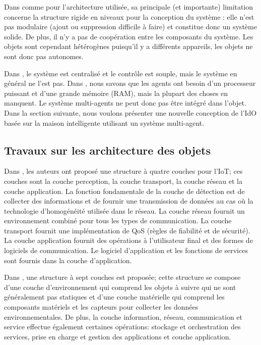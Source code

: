 Dans \cite{chap34} \cite{chap39} \cite{chap311}comme pour l'architecture utilisée, sa principale (et importante) limitation concerne la structure rigide en niveaux pour la conception du système : elle n'est pas modulaire (ajout ou suppression difficile à faire) et constitue donc un système solide. De plus, il n'y a pas de coopération entre les composants du système. Les objets sont cependant hétérogènes puisqu'il y a différents appareils, les objets ne sont donc pas autonomes. 


Dans \cite{chap39}, le système est centralisé et le contrôle est souple, mais le système en général ne l'est pas. Dans \cite{chap311}, nous savons que les agents ont besoin d'un processeur puissant et d'une grande mémoire (RAM), mais la plupart des choses en manquent. Le système multi-agents ne peut donc pas être intégré dans l'objet. Dans la section suivante, nous voulons présenter une nouvelle conception de l'IdO basée sur la maison intelligente utilisant un système multi-agent.

\subsection{Travaux sur les architecture des objets}
Dans \cite{chap312}, les auteurs ont proposé une structure à quatre couches pour l'IoT; ces couches sont la couche perception, la couche transport, la couche réseau et la couche application. La fonction fondamentale de la couche de détection est de collecter des informations et de fournir une transmission de données au cas où la technologie d'homogénéité utilisée dans le réseau. La couche réseau fournit un environnement combiné pour tous les types de communication. La couche transport fournit une implémentation de QoS (règles de fiabilité et de sécurité). La couche application fournit des opérations à l'utilisateur final et des formes de logiciels de communication. Le logiciel d'application et les fonctions de services sont fournis dans la couche d'application.


Dans \cite{chap313}, une structure à sept couches est proposée; cette structure se compose d'une couche d'environnement qui comprend les objets à suivre qui ne sont généralement pas statiques et d'une couche matérielle qui comprend les composants matériels et les capteurs pour collecter les données environnementales. De plus, la couche information, réseau, communication et service effectue également certaines opérations: stockage et orchestration des services, prise en charge et gestion des applications et couche application.


